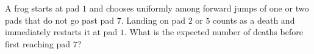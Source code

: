 A frog starts at pad $1$ and chooses uniformly among forward jumps of one or two pads that do not go past pad $7$. Landing on pad $2$ or $5$ counts as a death and immediately restarts it at pad $1$. What is the expected number of deaths before first reaching pad $7$?
